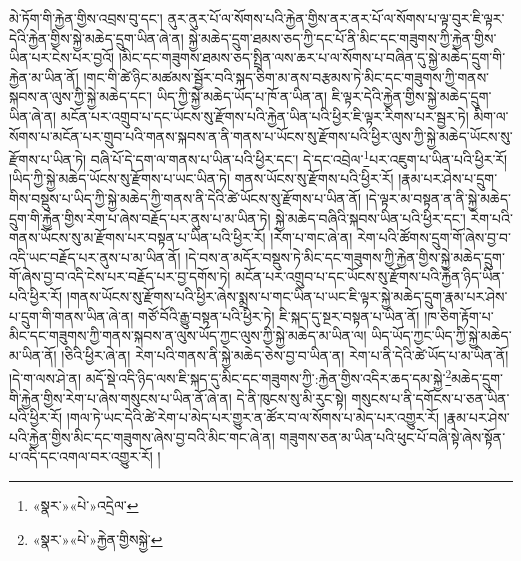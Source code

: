 མེ་ཏོག་གི་རྐྱེན་གྱིས་འབྲས་བུ་དང་། ནུར་ནུར་པོ་ལ་སོགས་པའི་རྐྱེན་གྱིས་ནར་ནར་པོ་ལ་སོགས་པ་ལྟ་བུར་ཇི་ལྟར་དེའི་རྐྱེན་གྱིས་སྐྱེ་མཆེད་དྲུག་ཡིན་ཞེ་ན། སྐྱེ་མཆེད་དྲུག་ཐམས་ཅད་ཀྱི་དང་པོ་ནི་མིང་དང་གཟུགས་ཀྱི་རྐྱེན་གྱིས་ཡིན་པར་ངེས་པར་བྱའོ། །མིང་དང་གཟུགས་ཐམས་ཅད་སྤྲིན་ལས་ཆར་པ་ལ་སོགས་པ་བཞིན་དུ་སྐྱེ་མཆེད་དྲུག་གི་རྐྱེན་མ་ཡིན་ནོ། །གང་གི་ཚེ་ཉིང་མཚམས་སྦྱོར་བའི་སྐད་ཅིག་མ་ནས་བརྩམས་ཏེ་མིང་དང་གཟུགས་ཀྱི་གནས་སྐབས་ན་ལུས་ཀྱི་སྐྱེ་མཆེད་དང་། ཡིད་ཀྱི་སྐྱེ་མཆེད་ཡོད་པ་ཁོ་ན་ཡིན་ན། ཇི་ལྟར་དེའི་རྐྱེན་གྱིས་སྐྱེ་མཆེད་དྲུག་ཡིན་ཞེ་ན། མངོན་པར་འགྲུབ་པ་དང་ཡོངས་སུ་རྫོགས་པའི་རྐྱེན་ཡིན་པའི་ཕྱིར་ཇི་ལྟར་རིགས་པར་སྦྱར་ཏེ། མིག་ལ་སོགས་པ་མངོན་པར་གྲུབ་པའི་གནས་སྐབས་ན་ནི་གནས་པ་ཡོངས་སུ་རྫོགས་པའི་ཕྱིར་ལུས་ཀྱི་སྐྱེ་མཆེད་ཡོངས་སུ་རྫོགས་པ་ཡིན་ཏེ། བཞི་པོ་དེ་དག་ལ་གནས་པ་ཡིན་པའི་ཕྱིར་དང་། དེ་དང་འབྲེལ་\footnote{«སྣར་»«པེ་»འདྲེལ་}པར་འཇུག་པ་ཡིན་པའི་ཕྱིར་རོ། །ཡིད་ཀྱི་སྐྱེ་མཆེད་ཡོངས་སུ་རྫོགས་པ་ཡང་ཡིན་ཏེ། གནས་ཡོངས་སུ་རྫོགས་པའི་ཕྱིར་རོ། །རྣམ་པར་ཤེས་པ་དྲུག་གིས་བསྡུས་པ་ཡིད་ཀྱི་སྐྱེ་མཆེད་ཀྱི་གནས་ནི་དེའི་ཚེ་ཡོངས་སུ་རྫོགས་པ་ཡིན་ནོ། །དེ་ལྟར་མ་བསྟན་ན་ནི་སྐྱེ་མཆེད་དྲུག་གི་རྐྱེན་གྱིས་རེག་པ་ཞེས་བརྗོད་པར་ནུས་པ་མ་ཡིན་ཏེ། སྐྱེ་མཆེད་བཞིའི་སྐབས་ཡིན་པའི་ཕྱིར་དང་། རེག་པའི་གནས་ཡོངས་སུ་མ་རྫོགས་པར་བསྟན་པ་ཡིན་པའི་ཕྱིར་རོ། །རེག་པ་གང་ཞེ་ན། རེག་པའི་ཚོགས་དྲུག་གོ་ཞེས་བྱ་བ་འདི་ཡང་བརྗོད་པར་ནུས་པ་མ་ཡིན་ནོ། །དེ་བས་ན་མདོར་བསྡུས་ཏེ་མིང་དང་གཟུགས་ཀྱི་རྐྱེན་གྱིས་སྐྱེ་མཆེད་དྲུག་གོ་ཞེས་བྱ་བ་འདི་ངེས་པར་བརྗོད་པར་བྱ་དགོས་ཏེ། མངོན་པར་འགྲུབ་པ་དང་ཡོངས་སུ་རྫོགས་པའི་རྐྱེན་ཉིད་ཡིན་པའི་ཕྱིར་རོ། །གནས་ཡོངས་སུ་རྫོགས་པའི་ཕྱིར་ཞེས་སྨྲས་པ་གང་ཡིན་པ་ཡང་ཇི་ལྟར་སྐྱེ་མཆེད་དྲུག་རྣམ་པར་ཤེས་པ་དྲུག་གི་གནས་ཡིན་ཞེ་ན། གཙོ་བོའི་རྒྱུ་བསྟན་པའི་ཕྱིར་ཏེ། ཇི་སྐད་དུ་སྔར་བསྟན་པ་ཡིན་ནོ། །ཁ་ཅིག་རྟོག་པ་མིང་དང་གཟུགས་ཀྱི་གནས་སྐབས་ན་ལུས་ཡོད་ཀྱང་ལུས་ཀྱི་སྐྱེ་མཆེད་མ་ཡིན་ལ། ཡིད་ཡོད་ཀྱང་ཡིད་ཀྱི་སྐྱེ་མཆེད་མ་ཡིན་ནོ། །ཅིའི་ཕྱིར་ཞེ་ན། རེག་པའི་གནས་ནི་སྐྱེ་མཆེད་ཅེས་བྱ་བ་ཡིན་ན། རེག་པ་ནི་དེའི་ཚེ་ཡོད་པ་མ་ཡིན་ནོ། །དེ་ག་ལས་ཤེ་ན། མདོ་སྡེ་འདི་ཉིད་ལས་ཇི་སྐད་དུ་མིང་དང་གཟུགས་ཀྱི་:རྐྱེན་གྱིས་འདིར་ཆད་དམ་སྐྱེ་\footnote{«སྣར་»«པེ་»རྐྱེན་གྱིསསྐྱེ་}མཆེད་དྲུག་གི་རྐྱེན་གྱིས་རེག་པ་ཞེས་གསུངས་པ་ཡིན་ནོ་ཞེ་ན། དེ་ནི་ཁུངས་སུ་མི་རུང་སྟེ། གསུངས་པ་ནི་དགོངས་པ་ཅན་ཡིན་པའི་ཕྱིར་རོ། །གལ་ཏེ་ཡང་དེའི་ཚེ་རེག་པ་མེད་པར་གྱུར་ན་ཚོར་བ་ལ་སོགས་པ་མེད་པར་འགྱུར་རོ། །རྣམ་པར་ཤེས་པའི་རྐྱེན་གྱིས་མིང་དང་གཟུགས་ཞེས་བྱ་བའི་མིང་གང་ཞེ་ན། གཟུགས་ཅན་མ་ཡིན་པའི་ཕུང་པོ་བཞི་སྟེ་ཞེས་སྟོན་པ་འདི་དང་འགལ་བར་འགྱུར་རོ། །
